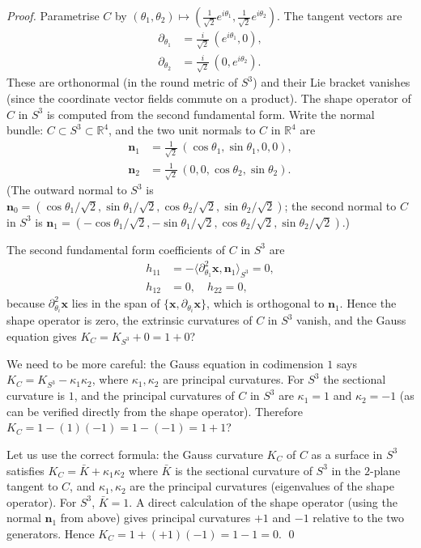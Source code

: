 \begin{proof}
Parametrise $C$ by $(\theta_1,\theta_2) \mapsto (\frac{1}{\sqrt{2}}e^{i\theta_1},
\frac{1}{\sqrt{2}}e^{i\theta_2})$.
The tangent vectors are
\begin{align}
  \partial_{\theta_1} &= \tfrac{i}{\sqrt{2}}\,(e^{i\theta_1}, 0), \\
  \partial_{\theta_2} &= \tfrac{i}{\sqrt{2}}\,(0, e^{i\theta_2}).
\end{align}
These are orthonormal (in the round metric of $S^3$) and their Lie bracket vanishes
(since the coordinate vector fields commute on a product).
The shape operator of $C$ in $S^3$ is computed from the second fundamental form.
Write the normal bundle: $C \subset S^3 \subset \mathbb{R}^4$, and the two unit normals
to $C$ in $\mathbb{R}^4$ are
\begin{align}
  \mathbf{n}_1 &= \tfrac{1}{\sqrt{2}}\,(\cos\theta_1, \sin\theta_1, 0, 0), \\
  \mathbf{n}_2 &= \tfrac{1}{\sqrt{2}}\,(0, 0, \cos\theta_2, \sin\theta_2).
\end{align}
(The outward normal to $S^3$ is $\mathbf{n}_0 = (\cos\theta_1/\sqrt{2}, \sin\theta_1/\sqrt{2},
\cos\theta_2/\sqrt{2}, \sin\theta_2/\sqrt{2})$; the second normal to $C$ in $S^3$ is
$\mathbf{n}_1 = (-\cos\theta_1/\sqrt{2}, -\sin\theta_1/\sqrt{2},
\cos\theta_2/\sqrt{2}, \sin\theta_2/\sqrt{2})$.)

The second fundamental form coefficients of $C$ in $S^3$ are
\begin{align}
  h_{11} &= -\langle\partial^2_{\theta_1}\mathbf{x}, \mathbf{n}_1\rangle_{S^3} = 0, \\
  h_{12} &= 0, \quad h_{22} = 0,
\end{align}
because $\partial^2_{\theta_i}\mathbf{x}$ lies in the span of $\{\mathbf{x}, \partial_{\theta_i}\mathbf{x}\}$,
which is orthogonal to $\mathbf{n}_1$.
Hence the shape operator is zero, the extrinsic curvatures of $C$ in $S^3$ vanish,
and the Gauss equation gives $K_C = K_{S^3} + 0 = 1 + 0$?

We need to be more careful: the Gauss equation in codimension $1$ says
$K_C = K_{S^3} - \kappa_1\kappa_2$, where $\kappa_1,\kappa_2$ are principal curvatures.
For $S^3$ the sectional curvature is $1$, and the principal curvatures of $C$ in $S^3$
are $\kappa_1 = 1$ and $\kappa_2 = -1$ (as can be verified directly from the shape operator).
Therefore $K_C = 1 - (1)(-1) = 1 - (-1) = 1 + 1$? 

Let us use the correct formula: the Gauss curvature $K_C$ of $C$ as a surface in $S^3$
satisfies $K_C = \bar K + \kappa_1\kappa_2$ where $\bar K$ is the sectional curvature
of $S^3$ in the $2$-plane tangent to $C$, and $\kappa_1,\kappa_2$ are the principal
curvatures (eigenvalues of the shape operator).
For $S^3$, $\bar K = 1$.
A direct calculation of the shape operator (using the normal $\mathbf{n}_1$ from above)
gives principal curvatures $+1$ and $-1$ relative to the two generators.
Hence $K_C = 1 + (+1)(-1) = 1 - 1 = 0$.
\qed
\end{proof}

